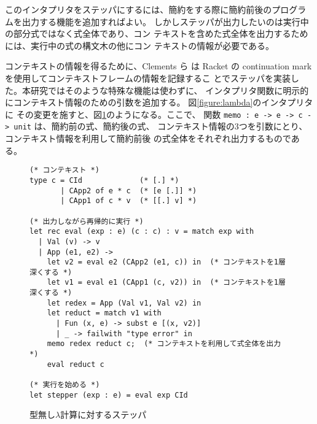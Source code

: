 このインタプリタをステッパにするには、簡約をする際に簡約前後のプログラ
ムを出力する機能を追加すればよい。
しかしステッパが出力したいのは実行中の部分式ではなく式全体であり、コン
テキストを含めた式全体を出力するためには、実行中の式の構文木の他にコン
テキストの情報が必要である。


コンテキストの情報を得るために、Clements ら\cite{clements01} は Racket
の continuation mark を使用してコンテキストフレームの情報を記録するこ
とでステッパを実装した。本研究ではそのような特殊な機能は使わずに、
インタプリタ関数に明示的にコンテキスト情報のための引数を追加する。
図\ref{figure:lambda}のインタプリタに
その変更を施すと、図\ref{figure:lambda_stepper}のようになる。ここで、
関数 \texttt{memo :\ e -> e -> c -> unit} は、簡約前の式、簡約後の式、
コンテキスト情報の3つを引数にとり、コンテキスト情報を利用して簡約前後
の式全体をそれぞれ出力するものである。


\begin{figure}
\begin{verbatim}
(* コンテキスト *)
type c = CId             (* [.] *)
       | CApp2 of e * c  (* [e [.]] *)
       | CApp1 of c * v  (* [[.] v] *)

(* 出力しながら再帰的に実行 *)
let rec eval (exp : e) (c : c) : v = match exp with
  | Val (v) -> v
  | App (e1, e2) ->
    let v2 = eval e2 (CApp2 (e1, c)) in  (* コンテキストを1層深くする *)
    let v1 = eval e1 (CApp1 (c, v2)) in  (* コンテキストを1層深くする *)
    let redex = App (Val v1, Val v2) in
    let reduct = match v1 with
      | Fun (x, e) -> subst e [(x, v2)]
      | _ -> failwith "type error" in
    memo redex reduct c;  (* コンテキストを利用して式全体を出力 *)
    eval reduct c

(* 実行を始める *)
let stepper (exp : e) = eval exp CId
\end{verbatim}
\caption{型無し$\lambda$計算に対するステッパ}
\label{figure:lambda_stepper}
\end{figure}

